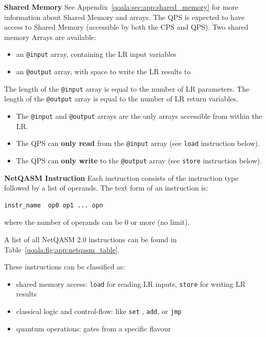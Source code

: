 \textbf{Shared Memory}
See Appendix~\ref{qoala:sec:app:shared_memory} for more information about Shared Memory and arrays.
The QPS is expected to have access to Shared Memory (accessible by both the CPS and QPS).
Two shared memory Arrays are available:
\begin{itemize}
\item an \texttt{@input} array, containing the LR input variables
\item an \texttt{@output} array, with space to write the LR results to
\end{itemize}

The length of the \texttt{@input} array is equal to the number of LR parameters.
The length of the \texttt{@output} array is equal to the number of LR return variables.

\begin{itemize}
\item The \texttt{@input} and \texttt{@output} arrays are the only arrays accessible from within the LR.
\item The QPS can \textbf{only read} from the \texttt{@input} array (see \texttt{load} instruction below).
\item The QPS can \textbf{only write} to the \texttt{@output} array (see \texttt{store} instruction below).
\end{itemize}

\textbf{NetQASM Instruction}
Each instruction consists of the instruction type followed by a list of operands.
The text form of an instruction is:

\begin{lstlisting}
instr_name  op0 op1 ... opn
\end{lstlisting}

where the number of operands can be 0 or more (no limit).

A list of all NetQASM 2.0 instructions can be found in Table~\ref{qoala:fig:app:netqasm_table}.

These instructions can be classified as:
\begin{itemize}
\item shared memory access: \texttt{load} for reading LR inputs, \texttt{store} for writing LR results
\item classical logic and control-flow: like \texttt{set} , \texttt{add}, or \texttt{jmp}
\item quantum operations: gates from a specific flavour~\cite{dahlberg2022netqasm}
\end{itemize}

